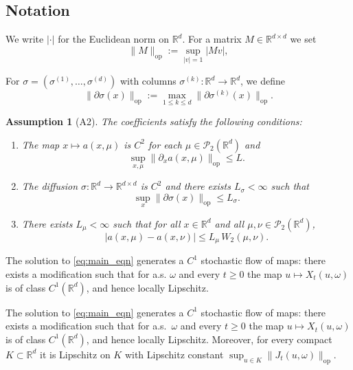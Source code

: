 \documentclass{tsp-short}
\newtheorem{assumption}{Assumption}
\theoremstyle{remark}
\theoremstyle{definition}
\begin{document}
\subsection*{Notation}
We write $|\cdot|$ for the Euclidean norm on $\mathbb{R}^d$.
For a matrix $M\in\mathbb{R}^{d\times d}$ we set
\begin{equation*}
\|M\|_{\mathrm{op}}:=\sup_{|v|=1}|Mv|,
\end{equation*}



For $\sigma=(\sigma^{(1)},\ldots,\sigma^{(d)})$ with columns $\sigma^{(k)}:\mathbb{R}^d\to\mathbb{R}^d$, we define
\begin{equation*}
\|\partial\sigma(x)\|_{\mathrm{op}}:=\max_{1\le k\le d}\|\partial \sigma^{(k)}(x)\|_{\mathrm{op}}.
\end{equation*}

\begin{assumption}[A2]\label{ass:general_lipschitz}
The coefficients satisfy the following conditions:
\begin{enumerate}
\item[(i)] The map $x\mapsto a(x,\mu)$ is $C^2$ for each $\mu\in\mathcal{P}_2(\mathbb{R}^d)$ and
\begin{equation*}
\sup_{x,\mu}\|\partial_x a(x,\mu)\|_{\mathrm{op}}\le L.
\end{equation*}
\item[(ii)] The diffusion $\sigma:\mathbb{R}^d\to\mathbb{R}^{d\times d}$ is $C^2$ and there exists $L_\sigma<\infty$ such that
\begin{equation*}
\sup_x \|\partial \sigma(x)\|_{\mathrm{op}}\le L_\sigma.
\end{equation*}
\item[(iii)] There exists $L_\mu<\infty$ such that for all $x\in\mathbb{R}^d$ and all $\mu,\nu\in\mathcal{P}_2(\mathbb{R}^d)$,
\begin{equation*}
|a(x,\mu)-a(x,\nu)|\le L_\mu\,W_2(\mu,\nu).
\end{equation*}
\end{enumerate}
\end{assumption}

The solution to \eqref{eq:main_eqn} generates a $C^1$ stochastic flow of maps: there exists a modification such that for a.s. $\omega$ and every $t\ge 0$ the map
$u\mapsto X_t(u,\omega)$ is of class $C^1(\mathbb{R}^d)$, and hence locally Lipschitz.
\medskip

\iffalse
The solution to \eqref{eq:main_eqn} generates a $C^1$ stochastic flow of maps: there exists a modification such that for a.s.\ $\omega$ and every $t\ge 0$ the map
$u\mapsto X_t(u,\omega)$ is of class $C^1(\mathbb{R}^d)$, and hence locally Lipschitz.
Moreover, for every compact $K\subset\mathbb{R}^d$ it is Lipschitz on $K$ with Lipschitz constant $\sup_{u\in K}\|J_t(u,\omega)\|_{\mathrm{op}}$.
\end{document}
